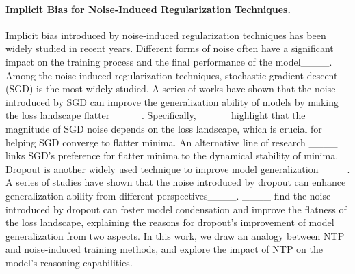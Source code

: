 \paragraph{\textbf{Implicit Bias for Noise-Induced Regularization Techniques.}}
Implicit bias introduced by noise-induced regularization techniques has been widely studied in recent years. Different forms of noise often have a significant impact on the training process and the final performance of the model____. Among the noise-induced regularization techniques, stochastic gradient descent (SGD) is the most widely studied. A series of works have shown that the noise introduced by SGD can improve the generalization ability of models by making the loss landscape flatter ____. Specifically, ____ highlight that the magnitude of SGD noise depends on the loss landscape, which is crucial for helping SGD converge to flatter minima. An alternative line of research ____ links SGD's preference for flatter minima to the dynamical stability of minima.
Dropout is another widely used technique to improve model generalization____. A series of studies have shown that the noise introduced by dropout can enhance generalization ability from different perspectives____. ____ find the noise introduced by dropout can foster model condensation and improve the flatness of the loss landscape, explaining the reasons for dropout’s improvement of model generalization from two aspects. In this work, we draw an analogy between NTP and noise-induced training methods, and explore the impact of NTP on the model's reasoning capabilities.
